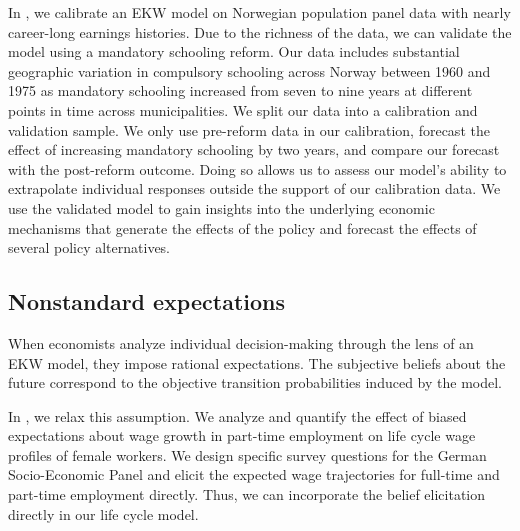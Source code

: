 In \citet{Bhuller.2018}, we calibrate an EKW model on Norwegian population panel data with nearly career-long earnings histories. Due to the richness of the data, we can validate the model using a mandatory schooling reform. Our data includes substantial geographic variation in compulsory schooling across Norway between 1960 and 1975 as mandatory schooling increased from seven to nine years at different points in time across municipalities. We split our data into a calibration and validation sample. We only use pre-reform data in our calibration, forecast the effect of increasing mandatory schooling by two years, and compare our forecast with the post-reform outcome. Doing so allows us to assess our model's ability to extrapolate individual responses outside the support of our calibration data. We use the validated model to gain insights into the underlying economic mechanisms that generate the effects of the policy and forecast the effects of several policy alternatives.
\subsection{Nonstandard expectations}
When economists analyze individual decision-making through the lens of an EKW model, they impose rational expectations. The subjective beliefs about the future correspond to the objective transition probabilities induced by the model.

In \citet{Eisenhauer.2020a}, we relax this assumption. We analyze and quantify the effect of biased expectations about wage growth in part-time employment on life cycle wage profiles of female workers. We design specific survey questions for the German Socio-Economic Panel \citep{Goebel.2019} and elicit the expected wage trajectories for full-time and part-time employment directly. Thus, we can incorporate the belief elicitation directly in our life cycle model.

